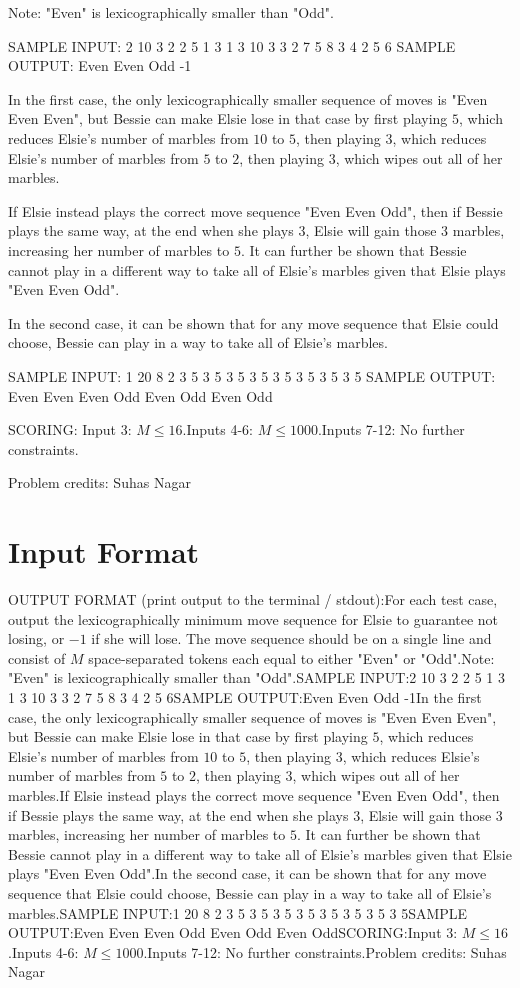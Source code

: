 \documentclass[12pt]{article}
\begin{document}
Note: "Even" is lexicographically smaller than "Odd".

SAMPLE INPUT:
2
10 3 2
2 5
1 3
1 3
10 3 3
2 7 5
8 3 4
2 5 6
SAMPLE OUTPUT: 
Even Even Odd
-1

In the first case, the only lexicographically smaller sequence of moves is "Even
Even Even", but Bessie can make Elsie lose in that case by first playing $5$,
which reduces Elsie's number of marbles from $10$ to $5$, then playing $3$, which
reduces Elsie's number of marbles from $5$ to $2$, then playing $3$, which wipes out
all of her marbles.

If Elsie instead plays the correct move sequence "Even Even Odd", then if Bessie
plays the same way, at the end when she plays $3$, Elsie will gain those $3$
marbles, increasing her number of marbles to $5$. It can further be shown that
Bessie cannot play in a different way to take all of Elsie's marbles given that
Elsie plays "Even Even Odd".

In the second case, it can be shown that for any move sequence that Elsie could
choose, Bessie can play in a way to take all of Elsie's marbles.

SAMPLE INPUT:
1
20 8 2
3 5
3 5
3 5
3 5
3 5
3 5
3 5
3 5
SAMPLE OUTPUT: 
Even Even Even Odd Even Odd Even Odd

SCORING:
Input 3: $M \leq 16$.Inputs 4-6: $M \leq 1000$.Inputs
7-12: No further constraints.


Problem credits: Suhas Nagar



\section*{Input Format}
OUTPUT FORMAT (print output to the terminal / stdout):For each test case, output the lexicographically minimum move sequence for Elsie
to guarantee not losing, or $-1$ if she will lose. The move sequence should be
on a single line and consist of $M$ space-separated tokens each equal to either
"Even" or "Odd".Note: "Even" is lexicographically smaller than "Odd".SAMPLE INPUT:2
10 3 2
2 5
1 3
1 3
10 3 3
2 7 5
8 3 4
2 5 6SAMPLE OUTPUT:Even Even Odd
-1In the first case, the only lexicographically smaller sequence of moves is "Even
Even Even", but Bessie can make Elsie lose in that case by first playing $5$,
which reduces Elsie's number of marbles from $10$ to $5$, then playing $3$, which
reduces Elsie's number of marbles from $5$ to $2$, then playing $3$, which wipes out
all of her marbles.If Elsie instead plays the correct move sequence "Even Even Odd", then if Bessie
plays the same way, at the end when she plays $3$, Elsie will gain those $3$
marbles, increasing her number of marbles to $5$. It can further be shown that
Bessie cannot play in a different way to take all of Elsie's marbles given that
Elsie plays "Even Even Odd".In the second case, it can be shown that for any move sequence that Elsie could
choose, Bessie can play in a way to take all of Elsie's marbles.SAMPLE INPUT:1
20 8 2
3 5
3 5
3 5
3 5
3 5
3 5
3 5
3 5SAMPLE OUTPUT:Even Even Even Odd Even Odd Even OddSCORING:Input 3: $M \leq 16$.Inputs 4-6: $M \leq 1000$.Inputs
7-12: No further constraints.Problem credits: Suhas Nagar
\end{document}
